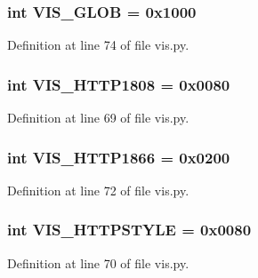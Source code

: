 \subsubsection[{V\+I\+S\+\_\+\+G\+L\+O\+B}]{\setlength{\rightskip}{0pt plus 5cm}int V\+I\+S\+\_\+\+G\+L\+O\+B = 0x1000}\label{namespacevis_ab3156563beec875859d0cadebf069ea9}


Definition at line 74 of file vis.\+py.

\subsubsection[{V\+I\+S\+\_\+\+H\+T\+T\+P1808}]{\setlength{\rightskip}{0pt plus 5cm}int V\+I\+S\+\_\+\+H\+T\+T\+P1808 = 0x0080}\label{namespacevis_a3346841405590a3d8120b378c8ef9783}


Definition at line 69 of file vis.\+py.

\subsubsection[{V\+I\+S\+\_\+\+H\+T\+T\+P1866}]{\setlength{\rightskip}{0pt plus 5cm}int V\+I\+S\+\_\+\+H\+T\+T\+P1866 = 0x0200}\label{namespacevis_a8136e55aef8647b46639c0dc5f91638a}


Definition at line 72 of file vis.\+py.

\subsubsection[{V\+I\+S\+\_\+\+H\+T\+T\+P\+S\+T\+Y\+L\+E}]{\setlength{\rightskip}{0pt plus 5cm}int V\+I\+S\+\_\+\+H\+T\+T\+P\+S\+T\+Y\+L\+E = 0x0080}\label{namespacevis_a08cada6cfdf6dc2b66d5b80cba666e41}


Definition at line 70 of file vis.\+py.

